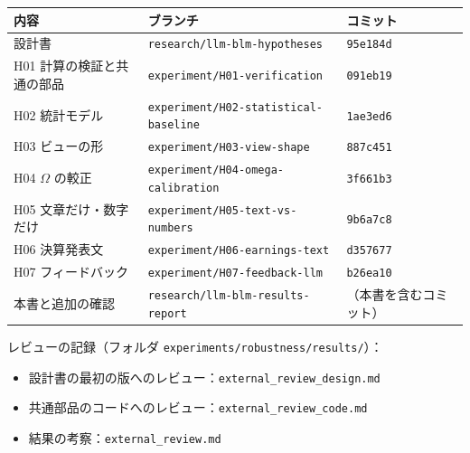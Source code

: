\documentclass[xelatex,ja=standard,jafont=haranoaji,a4paper,10pt,openany]{bxjsreport}
\newcommand{\code}[1]{\texttt{#1}}
\begin{document}
\begin{table}[htbp]
\centering
\small
\begin{tabular}{lll}
\toprule
内容 & ブランチ & コミット \\
\midrule
設計書 & \code{research/llm-blm-hypotheses} & \code{95e184d} \\
H01 計算の検証と共通の部品 & \code{experiment/H01-verification} & \code{091eb19} \\
H02 統計モデル & \code{experiment/H02-statistical-baseline} & \code{1ae3ed6} \\
H03 ビューの形 & \code{experiment/H03-view-shape} & \code{887c451} \\
H04 $\Omega$ の較正 & \code{experiment/H04-omega-calibration} & \code{3f661b3} \\
H05 文章だけ・数字だけ & \code{experiment/H05-text-vs-numbers} & \code{9b6a7c8} \\
H06 決算発表文 & \code{experiment/H06-earnings-text} & \code{d357677} \\
H07 フィードバック & \code{experiment/H07-feedback-llm} & \code{b26ea10} \\
本書と追加の確認 & \code{research/llm-blm-results-report} & （本書を含むコミット） \\
\bottomrule
\end{tabular}
\end{table}

レビューの記録（フォルダ \code{experiments/robustness/results/}）：
\begin{itemize}
\item 設計書の最初の版へのレビュー：\code{external\_review\_design.md}
\item 共通部品のコードへのレビュー：\code{external\_review\_code.md}
\item 結果の考察：\code{external\_review.md}
\end{itemize}
\end{document}
